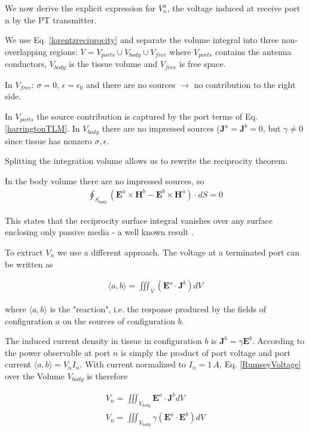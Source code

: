 We now derive the explicit expression for $V_n^a$, the voltage induced at receive port n by the PT transmitter.

We use Eq. \eqref{lorentzreciprocity} and separate the volume integral into three non-overlapping regions: $V = V_{ports} \cup V_{body} \cup V_{free}$ where $V_{ports}$ contains the antenna conductors, $V_{body}$ is the tissue volume and $V_{free}$ is free space.

In $V_{free}$: $\sigma=0$, $\epsilon = \epsilon_0$ and there are no sources $\rightarrow$ no contribution to the right side.

In $V_{ports}$ the source contribution is captured by the port terms of Eq. \eqref{harringtonTLM}. In $V_{body}$ there are no impressed sources ($\mathbf{J}^a=\mathbf{J}^b=0$, but $\gamma \neq 0$ since tissue has nonzero $\sigma, \epsilon$.

Splitting the integration volume allows us to rewrite the reciprocity theorem:

In the body volume there are no impressed sources, so
\begin{align}
    \label{Vbody}
    \oint_{S_{body}}(\mathbf{E}^a \times \mathbf{H}^b - \mathbf{E}^b \times \mathbf{H}^a) \cdot dS = 0
\end{align}

This states that the reciprocity surface integral vanishes over any surface enclosing only passive media - a well known result \cite{Harrington2001Time-harmonicFields}.

To extract $V_n$ we use a different approach. The voltage at a terminated port can be written as \cite{Rumsey1954ReactionTheory}

\begin{align}
    \label{RumseyVoltage}
    \langle a,b \rangle = \iiint_V (\mathbf{E}^a \cdot \mathbf{J}^b) dV
\end{align}

where $\langle a,b \rangle$ is the "reaction", i.e. the response produced by the fields of configuration $a$ on the sources of configuration $b$.

The induced current density in tissue in configuration $b$ is $\mathbf{J}^b=\gamma \mathbf{E}^b$.
According to \cite{Rumsey1954ReactionTheory} the power observable at port $n$ is simply the product of port voltage and port current $\langle a,b \rangle=V_n I_n$. With current normalized to $I_n=1\,A$, Eq. \eqref{RumseyVoltage} over the Volume $V_{body}$ is therefore

\begin{align}
    \label{PortVoltage}
    V_n = \iiint_{V_{body}} \mathbf{E}^a \cdot \mathbf{J}^b dV \\
    V_n = \iiint_{V_{body}} \gamma (\mathbf{E}^a \cdot \mathbf{E}^b) dV
\end{align}

